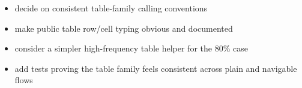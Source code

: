 \begin{itemize}
\tightlist
\item
  decide on consistent table-family calling conventions
\item
  make public table row/cell typing obvious and documented
\item
  consider a simpler high-frequency table helper for the 80\% case
\item
  add tests proving the table family feels consistent across plain and navigable flows
\end{itemize}

